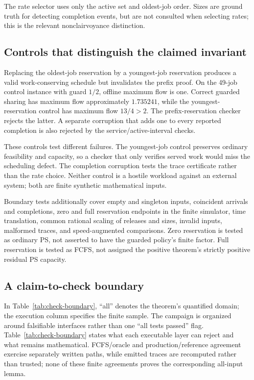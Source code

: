 The rate selector uses only the active set and oldest-job order. Sizes are ground truth for detecting completion events, but are not consulted when selecting rates; this is the relevant nonclairvoyance distinction.

\subsection{Controls that distinguish the claimed invariant}
Replacing the oldest-job reservation by a youngest-job reservation produces a valid work-conserving schedule but invalidates the prefix proof. On the 49-job control instance with guard $1/2$, offline maximum flow is one. Correct guarded sharing has maximum flow approximately $1.735241$, while the youngest-reservation control has maximum flow $13/4>2$. The prefix-reservation checker rejects the latter. A separate corruption that adds one to every reported completion is also rejected by the service/active-interval checks.

These controls test different failures. The youngest-job control preserves ordinary feasibility and capacity, so a checker that only verifies served work would miss the scheduling defect. The completion corruption tests the trace certificate rather than the rate choice. Neither control is a hostile workload against an external system; both are finite synthetic mathematical inputs.

Boundary tests additionally cover empty and singleton inputs, coincident arrivals and completions, zero and full reservation endpoints in the finite simulator, time translation, common rational scaling of releases and sizes, invalid inputs, malformed traces, and speed-augmented comparisons. Zero reservation is tested as ordinary PS, not asserted to have the guarded policy's finite factor. Full reservation is tested as FCFS, not assigned the positive theorem's strictly positive residual PS capacity.

\subsection{A claim-to-check boundary}\label{sec:finite-boundary}
In Table~\ref{tab:check-boundary}, ``all'' denotes the theorem's quantified
domain; the execution column specifies the finite sample.
The campaign is organized around falsifiable interfaces rather than one ``all tests passed'' flag. Table~\ref{tab:check-boundary} states what each executable layer can reject and what remains mathematical. FCFS/oracle and production/reference agreement exercise separately written paths, while emitted traces are recomputed rather than trusted; none of these finite agreements proves the corresponding all-input lemma.

